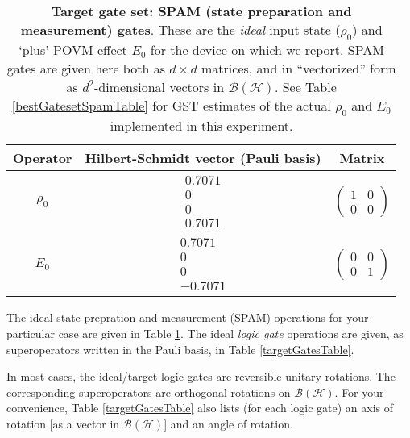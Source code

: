 \documentclass{article}[11pt]
\begin{document}
\begin{table}[h]
\begin{center}
\begin{tabular}[l]{|c|c|c|}
\hline
Operator & Hilbert-Schmidt vector (Pauli basis) & Matrix \\ \hline
$\rho_{0}$ & $ \begin{array}{c}
0.7071 \\ 
0 \\ 
0 \\ 
0.7071
 \end{array} $
 & $ \left(\!\!\begin{array}{cc}
1 & 0 \\ 
0 & 0
 \end{array}\!\!\right) $
 \\ \hline
$E_{0}$ & $ \begin{array}{c}
0.7071 \\ 
0 \\ 
0 \\ 
-0.7071
 \end{array} $
 & $ \left(\!\!\begin{array}{cc}
0 & 0 \\ 
0 & 1
 \end{array}\!\!\right) $
 \\ \hline
\end{tabular}

\caption{\textbf{Target gate set: SPAM (state preparation and measurement) gates}.  These are the \emph{ideal} input state ($\rho_0$) and `plus' POVM effect $E_0$ for the device on which we report.  SPAM gates are given here both as $d\times d$ matrices, and in ``vectorized'' form as $d^2$-dimensional vectors in $\mathcal{B}(\mathcal{H})$.  See Table \ref{bestGatesetSpamTable} for GST estimates of the actual $\rho_0$ and $E_0$ implemented in this experiment.\label{targetSpamTable}}
\end{center}
\end{table}

The ideal state prepration and measurement (SPAM) operations for your particular case are given in Table \ref{targetSpamTable}.  The ideal \emph{logic gate} operations are given, as superoperators written in the Pauli basis, in Table \ref{targetGatesTable}.

In most cases, the ideal/target logic gates are reversible unitary rotations.  The corresponding superoperators are orthogonal rotations on $\mathcal{B}(\mathcal{H})$.  For your convenience, Table \ref{targetGatesTable} also lists (for each logic gate) an axis of rotation [as a vector in $\mathcal{B}(\mathcal{H})$] and an angle of rotation.  
\end{document}
